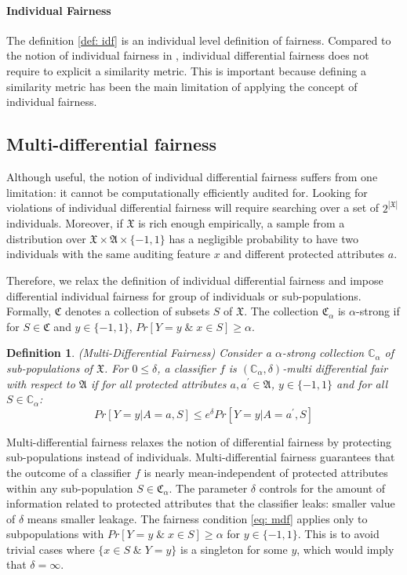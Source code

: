 \documentclass{article}
\newtheorem{defn}{Definition}[section]
\begin{document}
\paragraph{Individual Fairness}
The definition \ref{def: idf} is an individual level definition of fairness. Compared to the notion of individual fairness in \cite{dwork2012fairness}, individual differential fairness does not require to explicit a similarity metric. This is important because defining a similarity metric has been the main limitation of applying the concept of individual fairness.

\subsection{Multi-differential fairness}
Although useful, the notion of individual differential fairness suffers from one limitation: it cannot be computationally efficiently audited for. Looking for violations of individual differential fairness will require searching over a set of $2^{|\mathfrak{X}|}$ individuals. Moreover, if $\mathfrak{X}$ is rich enough empirically, a sample from a distribution over $\mathfrak{X} \times \mathfrak{A}\times \{-1, 1\}$ has a negligible probability to have two individuals with the same auditing feature $x$ and different protected attributes $a$. 

\bigskip
Therefore, we relax the definition of individual differential fairness and impose differential individual fairness for group of individuals or sub-populations. Formally, $\mathfrak{C}$ denotes a collection of subsets $S$ of $\mathfrak{X}$. The collection $\mathfrak{C}_{\alpha}$ is $\alpha$-strong if for $S\in \mathfrak{C}$ and $y\in \{-1, 1\}$, $Pr[Y=y \;\&\; x\in S] \geq \alpha$.  

\begin{defn}(Multi-Differential Fairness)
\label{def: mdf}
Consider a $\alpha$-strong collection $\mathbb{C}_{\alpha}$ of sub-populations of $\mathfrak{X}$. For $0\leq \delta$, a classifier $f$ is $(\mathbb{C}_{\alpha}, \delta)$-multi differential fair with respect to $\mathfrak{A}$ if for all protected attributes $a, a^{'}\in \mathfrak{A}$, $y\in\{-1, 1\}$ and for all $S\in \mathbb{C}_{\alpha}$:
\begin{equation}
\label{eq: mdf}
Pr[Y=y|A=a, S] \leq e^{\delta} Pr[Y=y|A=a^{'}, S]
\end{equation}
\end{defn}

Multi-differential fairness relaxes the notion of differential fairness by protecting sub-populations instead of individuals. Multi-differential fairness guarantees that the outcome of a classifier $f$ is nearly mean-independent of protected attributes within any sub-population $S\in \mathfrak{C}_{\alpha}$. The parameter $\delta$ controls for the amount of information related to protected attributes that the classifier leaks: smaller value of $\delta$ means smaller leakage. The fairness condition \ref{eq: mdf} applies only to subpopulations with $Pr[Y=y \;\&\; x\in S] \geq \alpha$ for $y\in\{-1, 1\}$. This is to avoid trivial cases where $\{x\in S \; \& \; Y=y\}$ is a singleton for some $y$, which would imply that $\delta=\infty$. 
\end{document}
